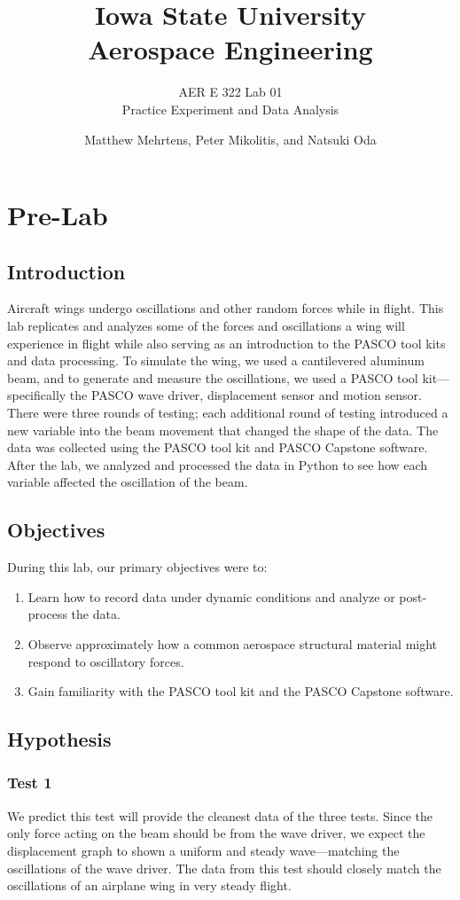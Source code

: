 \documentclass[12 pt]{report}
\title{\textbf{Iowa State University
\\{\Large Aerospace Engineering}}}
\subtitle{AER E 322 Lab 01\\
		  Practice Experiment and Data Analysis}
\author{Matthew Mehrtens, Peter Mikolitis, and Natsuki Oda}
\begin{document}
\maketitle
\tableofcontents

\chapter{Pre-Lab} \label{pre-lab}
\section{Introduction} \label{introduction}
Aircraft wings undergo oscillations and other random forces while in flight. This lab replicates and analyzes some of the forces and oscillations a wing will experience in flight while also serving as an introduction to the PASCO tool kits and data processing. To simulate the wing, we used a cantilevered aluminum beam, and to generate and measure the oscillations, we used a PASCO tool kit---specifically the PASCO wave driver, displacement sensor and motion sensor. There were three rounds of testing; each additional round of testing introduced a new variable into the beam movement that changed the shape of the data. The data was collected using the PASCO tool kit and PASCO Capstone software. After the lab, we analyzed and processed the data in Python to see how each variable affected the oscillation of the beam.

\section{Objectives} \label{objectives}
During this lab, our primary objectives were to:
\begin{enumerate}
	\item Learn how to record data under dynamic conditions and analyze or post-process the data.
	\item Observe approximately how a common aerospace structural material might respond to oscillatory forces.
	\item Gain familiarity with the PASCO tool kit and the PASCO Capstone software.
\end{enumerate}

\section{Hypothesis} \label{hypothesis}
\subsection{Test 1} \label{hypothesis-test_1}
We predict this test will provide the cleanest data of the three tests. Since the only force acting on the beam should be from the wave driver, we expect the displacement graph to shown a uniform and steady wave---matching the oscillations of the wave driver. The data from this test should closely match the oscillations of an airplane wing in very steady flight.
\end{document}

